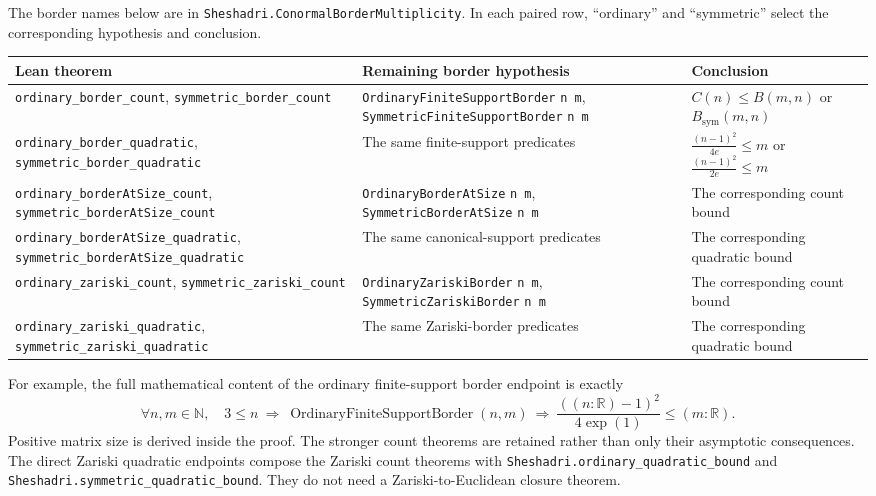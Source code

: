 The border names below are in
\nolinkurl{Sheshadri.ConormalBorderMultiplicity}.  In each paired row,
``ordinary'' and ``symmetric'' select the corresponding hypothesis and
conclusion.

\begingroup\small
\begin{longtable}{@{}>{\raggedright\arraybackslash}p{}>{\raggedright\arraybackslash}p{}>{\raggedright\arraybackslash}p{}@{}}
\toprule
Lean theorem & Remaining border hypothesis & Conclusion\\
\midrule
\endhead
\nolinkurl{ordinary_border_count},
\nolinkurl{symmetric_border_count} &
\nolinkurl{OrdinaryFiniteSupportBorder} \texttt{n m},
\nolinkurl{SymmetricFiniteSupportBorder} \texttt{n m} &
$C(n)\leq B(m,n)$ or $B_{\mathrm{sym}}(m,n)$\\[4pt]
\nolinkurl{ordinary_border_quadratic},
\nolinkurl{symmetric_border_quadratic} &
The same finite-support predicates &
$\displaystyle\frac{(n-1)^2}{4e}\leq m$ or
$\displaystyle\frac{(n-1)^2}{2e}\leq m$\\[7pt]
\nolinkurl{ordinary_borderAtSize_count},
\nolinkurl{symmetric_borderAtSize_count} &
\nolinkurl{OrdinaryBorderAtSize} \texttt{n m},
\nolinkurl{SymmetricBorderAtSize} \texttt{n m} &
The corresponding count bound\\[4pt]
\nolinkurl{ordinary_borderAtSize_quadratic},
\nolinkurl{symmetric_borderAtSize_quadratic} &
The same canonical-support predicates &
The corresponding quadratic bound\\[4pt]
\nolinkurl{ordinary_zariski_count},
\nolinkurl{symmetric_zariski_count} &
\nolinkurl{OrdinaryZariskiBorder} \texttt{n m},
\nolinkurl{SymmetricZariskiBorder} \texttt{n m} &
The corresponding count bound\\[4pt]
\nolinkurl{ordinary_zariski_quadratic},
\nolinkurl{symmetric_zariski_quadratic} &
The same Zariski-border predicates &
The corresponding quadratic bound\\
\bottomrule
\end{longtable}
\endgroup

For example, the full mathematical content of the ordinary finite-support
border endpoint is exactly
\[
 \forall n,m\in\mathbb N,\quad
 3\leq n\ \Longrightarrow\
 \operatorname{OrdinaryFiniteSupportBorder}(n,m)
 \ \Longrightarrow\
 \frac{((n:\mathbb R)-1)^2}{4\exp(1)}\leq(m:\mathbb R).
\]
Positive matrix size is derived inside the proof.  The stronger count
theorems are retained rather than only their asymptotic consequences.
The direct Zariski quadratic endpoints compose the Zariski count theorems
with \nolinkurl{Sheshadri.ordinary_quadratic_bound} and
\nolinkurl{Sheshadri.symmetric_quadratic_bound}.  They do not
need a Zariski-to-Euclidean closure theorem.

